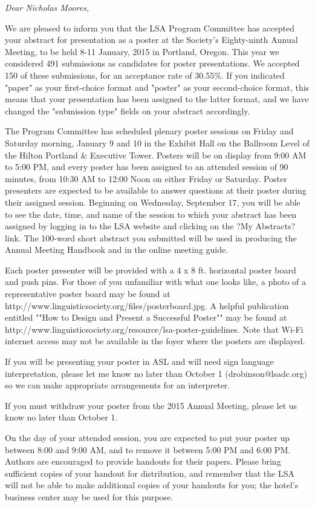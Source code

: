 \documentclass[12pt, oneside]{article}   	%
\begin{document}
{\it Dear Nicholas Moores,

We are pleased to inform you that the LSA Program Committee has accepted your abstract for presentation as a poster at the Society's Eighty-ninth Annual Meeting, to be held 8-11 January, 2015 in Portland, Oregon. This year we considered 491 submissions as candidates for poster presentations. We accepted 150 of these submissions, for an acceptance rate of 30.55\%. If you indicated "paper" as your first-choice format and "poster" as your second-choice format, this means that your presentation has been assigned to the latter format, and we have changed the "submission type" fields on your abstract accordingly.

The Program Committee has scheduled plenary poster sessions on Friday and Saturday morning, January 9 and 10 in the Exhibit Hall on the Ballroom Level of the Hilton Portland \& Executive Tower. Posters will be on display from 9:00 AM to 5:00 PM, and every poster has been assigned to an attended session of 90 minutes, from 10:30 AM to 12:00 Noon on either Friday or Saturday. Poster presenters are expected to be available to answer questions at their poster during their assigned session. Beginning on Wednesday, September 17, you will be able to see the date, time, and name of the session to which your abstract has been assigned by logging in to the LSA website and clicking on the ?My Abstracts? link. The 100-word short abstract you submitted will be used in producing the Annual Meeting Handbook and in the online meeting guide.

Each poster presenter will be provided with a 4 x 8 ft. horizontal poster board and push pins. For those of you unfamiliar with what one looks like, a photo of a representative poster board may be found at http://www.linguisticsociety.org/files/posterboard.jpg. A helpful publication entitled ""How to Design and Present a Successful Poster"" may be found at http://www.linguisticsociety.org/resource/lsa-poster-guidelines. Note that Wi-Fi internet access may not be available in the foyer where the posters are displayed.

If you will be presenting your poster in ASL and will need sign language interpretation, please let me know no later than October 1 (drobinson@lsadc.org) so we can make appropriate arrangements for an interpreter.

If you must withdraw your poster from the 2015 Annual Meeting, please let us know no later than October 1.

On the day of your attended session, you are expected to put your poster up between 8:00 and 9:00 AM, and to remove it between 5:00 PM and 6:00 PM. Authors are encouraged to provide handouts for their papers. Please bring sufficient copies of your handout for distribution, and remember that the LSA will not be able to make additional copies of your handouts for you; the hotel's business center may be used for this purpose.

}
\end{document}
